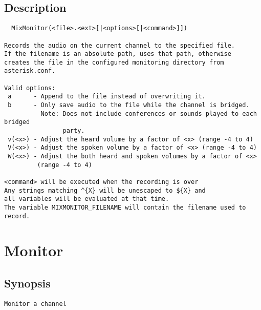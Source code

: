 \subsection{Description}
\begin{verbatim}
  MixMonitor(<file>.<ext>[|<options>[|<command>]])

Records the audio on the current channel to the specified file.
If the filename is an absolute path, uses that path, otherwise
creates the file in the configured monitoring directory from
asterisk.conf.

Valid options:
 a      - Append to the file instead of overwriting it.
 b      - Only save audio to the file while the channel is bridged.
          Note: Does not include conferences or sounds played to each bridged
                party.
 v(<x>) - Adjust the heard volume by a factor of <x> (range -4 to 4)
 V(<x>) - Adjust the spoken volume by a factor of <x> (range -4 to 4)
 W(<x>) - Adjust the both heard and spoken volumes by a factor of <x>
         (range -4 to 4)

<command> will be executed when the recording is over
Any strings matching ^{X} will be unescaped to ${X} and 
all variables will be evaluated at that time.
The variable MIXMONITOR_FILENAME will contain the filename used to record.

\end{verbatim}


\section{Monitor}
\subsection{Synopsis}
\begin{verbatim}
Monitor a channel
\end{verbatim}
